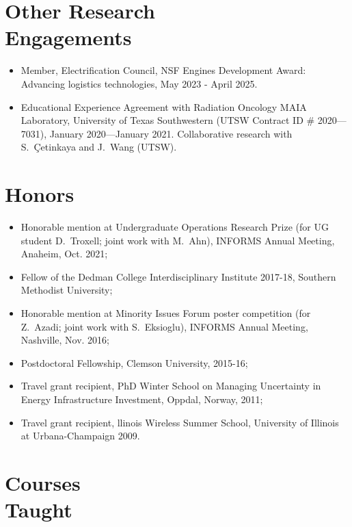 \documentclass[hyperref, margin]{myResume}
\begin{document}
\begin{resume}
\section{Other Research\\Engagements}
\begin{itemize}[leftmargin=17pt]
	\item Member, Electrification Council, NSF Engines Development Award: Advancing logistics technologies, May 2023 - April 2025.
	\item Educational Experience Agreement with Radiation Oncology MAIA Laboratory, University of Texas Southwestern (UTSW Contract ID \# 2020—7031), January 2020—January 2021. Collaborative research with S.\ \c{C}etinkaya and J.\ Wang (UTSW).
\end{itemize}

\section{Honors} 
\begin{itemize}[leftmargin=17pt]
	\item Honorable mention at Undergraduate Operations Research Prize (for UG student D.\ Troxell; joint work with M.\ Ahn), INFORMS Annual Meeting, Anaheim, Oct. 2021;
	\item Fellow of the Dedman College Interdisciplinary Institute 2017-18, Southern Methodist University;
	\item Honorable mention at Minority Issues Forum poster competition (for Z.\ Azadi\footnotemark[1]; joint work with S.\ Eksioglu), INFORMS Annual Meeting, Nashville, Nov. 2016;
	\item Postdoctoral Fellowship, Clemson University, 2015-16;
	\item Travel grant recipient, PhD Winter School on Managing Uncertainty in Energy Infrastructure Investment, Oppdal, Norway, 2011;
	\item Travel grant recipient, llinois Wireless Summer School, University of Illinois at Urbana-Champaign 2009.
\end{itemize}

\section{Courses\\Taught}
	

\end{resume}
\end{document}
